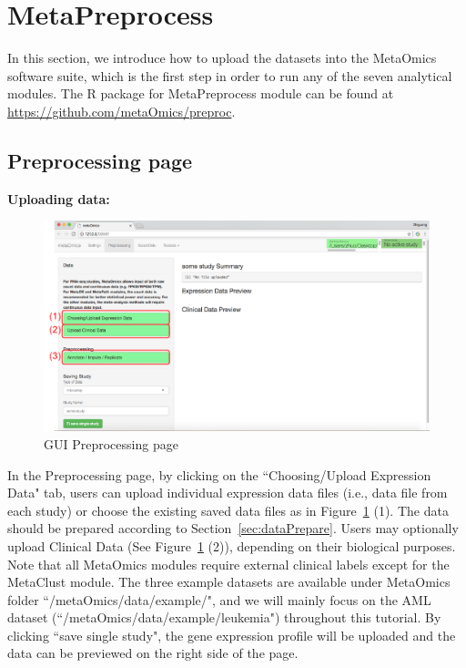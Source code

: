 

\section{MetaPreprocess}

In this section, we introduce how to upload the datasets into the MetaOmics software suite,
which is the first step in order to run any of the seven analytical modules.
The R package for MetaPreprocess module can be found at \url{https://github.com/metaOmics/preproc}.

\subsection{Preprocessing page}
\label{sec:procedure}

\begin{steps}
\item \textbf{Uploading data:}

\begin{figure}[!htbp]
\begin{center}
\includegraphics[scale=1]{./figure/preprocessing/GUIpreprocessing}
\caption{GUI Preprocessing page}
\label{fig:GUIpreprocessing}
\end{center}
\end{figure}

In the Preprocessing page,
by clicking on the ``Choosing/Upload Expression Data" tab,
users can upload individual expression data files (i.e., data file from each study) 
or choose the existing saved data files as in Figure~\ref{fig:GUIpreprocessing} {\color{red} (1)}.
The data should be prepared according to Section~\ref{sec:dataPrepare}.
Users may optionally upload Clinical Data (See Figure~\ref{fig:GUIpreprocessing} {\color{red} (2)}), 
depending on their biological purposes.
Note that all MetaOmics modules require external clinical labels except for the MetaClust module.
The three example datasets are available under MetaOmics folder ``/metaOmics/data/example/",
and we will mainly focus on the AML dataset (``/metaOmics/data/example/leukemia") throughout this tutorial.
By clicking ``save single study", the gene expression profile will be uploaded and the data can be previewed on the right side of the page.



\end{steps}

